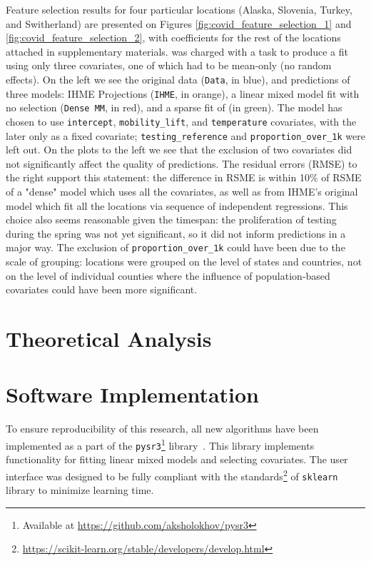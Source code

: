 Feature selection results for four particular locations (Alaska, Slovenia, Turkey, and Switherland) are presented on Figures \ref{fig:covid_feature_selection_1} and \ref{fig:covid_feature_selection_2}, with coefficients for the rest of the locations attached in supplementary materials. \ouralgo was charged with a task to produce a fit using only three covariates, one of which had to be mean-only (no random effects). On the left we see the original data (\texttt{Data}, in {\color{blue} blue}), and predictions of three models: IHME Projections (\texttt{IHME}, in {\color{orange} orange}), a linear mixed model fit with no selection (\texttt{Dense MM}, in {\color{red} red}), and a sparse fit of \ouralgo (\ouralgo in {\color{green} green}). The \ouralgo model has chosen to use \texttt{intercept}, \texttt{mobility\_lift}, and \texttt{temperature} covariates, with the later only as a fixed covariate; \texttt{testing\_reference} and \texttt{proportion\_over\_1k} were left out. On the plots to the left we see that the exclusion of two covariates did not significantly affect the quality of predictions. The residual errors (RMSE) to the right support this statement: the difference in RSME is within 10\% of RSME of a "dense" model which uses all the covariates, as well as from IHME's original model which fit all the locations via sequence of independent regressions. This choice also seems reasonable given the timespan: the proliferation of testing during the spring was not yet significant, so it did not inform predictions in a major way. The exclusion of \texttt{proportion\_over\_1k} could have been due to the scale of grouping: locations were grouped on the level of states and countries, not on the level of individual counties where the influence of population-based covariates could have been more significant. 

\section{Theoretical Analysis}


\section{Software Implementation}
To ensure reproducibility of this research, all new algorithms have been implemented as a part of the \texttt{pysr3}\footnote{Available at \href{https://github.com/aksholokhov/pysr3}{https://github.com/aksholokhov/pysr3}} library~\cite{sholokhov2023pysr3}. This library implements functionality for fitting linear mixed models and selecting covariates. The user interface was designed to be fully compliant with the standards\footnote{\href{https://scikit-learn.org/stable/developers/develop.html}{https://scikit-learn.org/stable/developers/develop.html}} of \texttt{sklearn} library to minimize learning time. 

